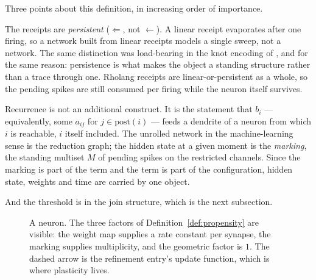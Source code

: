 \documentclass[11pt,a4paper]{article}
\theoremstyle{plain}
\theoremstyle{definition}
\theoremstyle{remark}
\newcommand{\wmap}{w}
\begin{document}
Three points about this definition, in increasing order of importance.

The receipts are \emph{persistent} ($\Leftarrow$, not $\leftarrow$). A linear receipt evaporates
after one firing, so a network built from linear receipts models a single sweep, not a network. The
same distinction was load-bearing in the knot encoding of \cite{knots}, and for the same reason:
persistence is what makes the object a standing structure rather than a trace through one.
Rholang receipts are linear-or-persistent as a whole, so the pending spikes are still consumed per
firing while the neuron itself survives.

Recurrence is not an additional construct. It is the statement that $b_i$ --- equivalently, some
$a_{ij}$ for $j \in \mathrm{post}(i)$ --- feeds a dendrite of a neuron from which $i$ is reachable,
$i$ itself included. The unrolled network in the machine-learning sense is the reduction graph; the
hidden state at a given moment is the \emph{marking}, the standing multiset $M$ of pending spikes on
the restricted channels. Since the marking is part of the term and the term is part of the
configuration, hidden state, weights and time are carried by one object.

And the threshold is in the join structure, which is the next subsection.

\begin{figure}[t]
\centering
{}
\caption{A neuron. The three factors of Definition~\ref{def:propensity} are visible: the weight map
supplies a rate constant per synapse, the marking supplies multiplicity, and the geometric factor is
$1$. The dashed arrow is the refinement entry's update function, which is where plasticity lives.}
\label{fig:neuron}
\end{figure}
\end{document}
